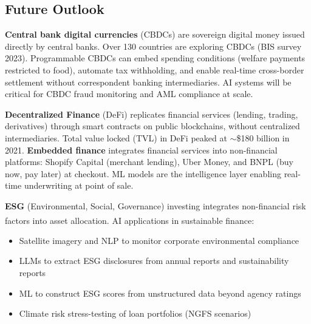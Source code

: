 \subsection{Future Outlook}

\begin{tcbitemize}[ skin=sectionraster ]

    \tcbitem[title=CBDCs and Programmable Money, raster multicolumn=3]
    \textbf{Central bank digital currencies} (CBDCs) are sovereign digital money issued directly by central banks.
    Over 130 countries are exploring CBDCs (BIS survey 2023).
    Programmable CBDCs can embed spending conditions (welfare payments restricted to food), automate tax withholding, and enable real-time cross-border settlement without correspondent banking intermediaries.
    AI systems will be critical for CBDC fraud monitoring and AML compliance at scale.

    \tcbitem[title=DeFi and Embedded Finance, raster multicolumn=3]
    \textbf{Decentralized Finance} (DeFi) replicates financial services (lending, trading, derivatives) through smart contracts on public blockchains, without centralized intermediaries.
    Total value locked (TVL) in DeFi peaked at $\sim$\$180 billion in 2021.
    \textbf{Embedded finance} integrates financial services into non-financial platforms: Shopify Capital (merchant lending), Uber Money, and BNPL (buy now, pay later) at checkout.
    ML models are the intelligence layer enabling real-time underwriting at point of sale.

    \tcbitem[title=ESG and Sustainable Finance, raster multicolumn=3]
    \textbf{ESG} (Environmental, Social, Governance) investing integrates non-financial risk factors into asset allocation.
    AI applications in sustainable finance\textsuperscript{\cite[][p.~715]{jansenMachineLearningAlgorithmic2020}}:
    \tcblower
    \begin{itemize}
        \item Satellite imagery and NLP to monitor corporate environmental compliance
        \item LLMs to extract ESG disclosures from annual reports and sustainability reports
        \item ML to construct ESG scores from unstructured data beyond agency ratings
        \item Climate risk stress-testing of loan portfolios (NGFS scenarios)
    \end{itemize}

\end{tcbitemize}

